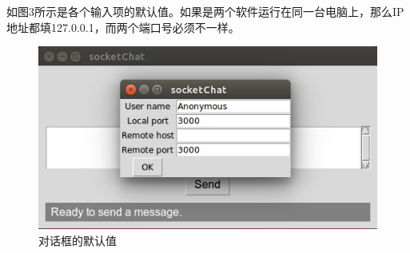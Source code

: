 \documentclass[a4paper, nofonts, nocap]{ctexart}
\begin{document}
如图3所示是各个输入项的默认值。如果是两个软件运行在同一台电脑上，那么IP地址都填127.0.0.1，而两个端口号必须不一样。
\begin{figure}[ht]
	\centering
	\includegraphics[scale=0.8]{images/dialog.png}
	\caption{对话框的默认值}
\end{figure}
\end{document}
